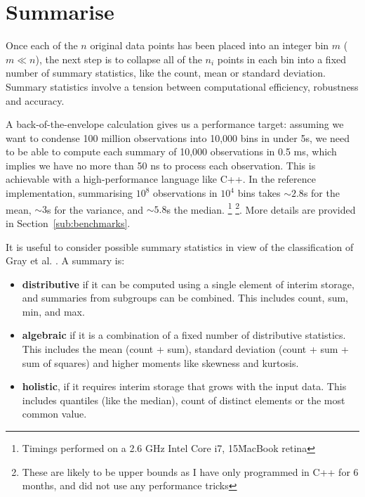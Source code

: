 \documentclass[journal]{vgtc}                %
\begin{document}


\section{Summarise}
\label{sec:summarise}

Once each of the $n$ original data points has been placed into an integer bin $m$ ($m \ll n$), the next step is to collapse all of the $n_i$ points in each bin into a fixed number of summary statistics, like the count, mean or standard deviation. Summary statistics involve a tension between computational efficiency, robustness and accuracy.

A back-of-the-envelope calculation gives us a performance target: assuming we want to condense 100 million observations into 10,000 bins in under 5s, we need to be able to compute each summary of 10,000 observations in 0.5 ms, which implies we have no more than 50 ns to process each observation. This is achievable with a high-performance language like C++. In the reference implementation, summarising $10^8$ observations in $10^4$ bins takes $\sim 2.8$s for the mean, $\sim 3$s for the variance, and $\sim 5.8$s the median. \footnote{Timings performed on a 2.6 GHz Intel Core i7, 15\" MacBook retina} \footnote{These are likely to be upper bounds as I have only programmed in C++ for 6 months, and did not use any performance tricks}.  More details are provided in Section~\ref{sub:benchmarks}.

It is useful to consider possible summary statistics in view of the classification of Gray et al. \citep{gray:1997}. A summary is:

\begin{itemize}
  \item {\bf distributive} if it can be computed using a single element of interim storage, and summaries from subgroups can be combined. This includes count, sum, min, and max.
  
  \item {\bf algebraic} if it is a combination of a fixed number of distributive statistics. This includes the mean (count + sum), standard deviation (count + sum + sum of squares) and higher moments like skewness and kurtosis.
  
  \item {\bf holistic}, if it requires interim storage that grows with the input data. This includes quantiles (like the median), count of distinct elements or the most common value. 

\end{itemize}
\end{document}
